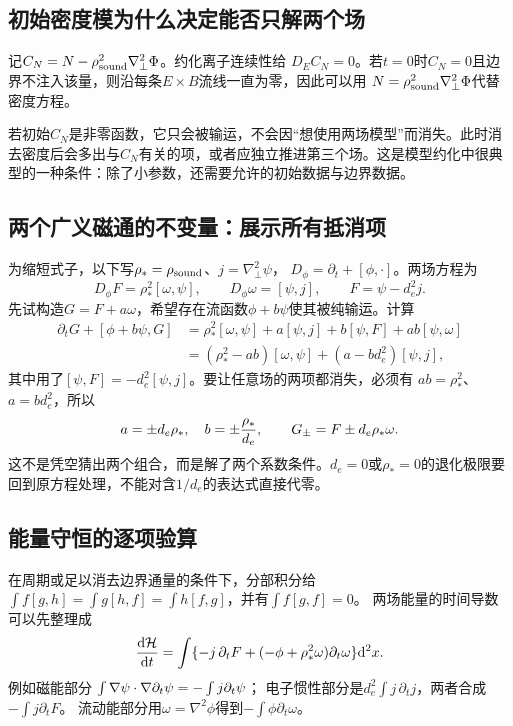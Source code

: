\subsection{初始密度模为什么决定能否只解两个场}
记$C_N=N-\rho_{\rm sound}^2\nabla_\perp^2\Phi$。约化离子连续性给
$D_EC_N=0$。若$t=0$时$C_N=0$且边界不注入该量，则沿每条$E\times B$流线一直为零，因此可以用
$N=\rho_{\rm sound}^2\nabla_\perp^2\Phi$代替密度方程。

若初始$C_N$是非零函数，它只会被输运，不会因“想使用两场模型”而消失。此时消去密度后会多出与$C_N$有关的项，或者应独立推进第三个场。这是模型约化中很典型的一种条件：除了小参数，还需要允许的初始数据与边界数据。

\subsection{两个广义磁通的不变量：展示所有抵消项}
为缩短式子，以下写$\rho_*=\rho_{\rm sound}$、$j=\nabla_\perp^2\psi$，
$D_\phi=\partial_t+[\phi,\cdot]$。两场方程为
\begin{equation}
 D_\phi F=\rho_*^2[\omega,\psi],\qquad
 D_\phi\omega=[\psi,j],\qquad F=\psi-d_e^2j.
\end{equation}
先试构造$G=F+a\omega$，希望存在流函数$\phi+b\psi$使其被纯输运。计算
\begin{align}
 \partial_tG+[\phi+b\psi,G]
 &=\rho_*^2[\omega,\psi]+a[\psi,j]+b[\psi,F]+ab[\psi,\omega]\\
 &=(\rho_*^2-ab)[\omega,\psi]+(a-bd_e^2)[\psi,j],
\end{align}
其中用了$[\psi,F]=-d_e^2[\psi,j]$。要让任意场的两项都消失，必须有
$ab=\rho_*^2$、$a=bd_e^2$，所以
\begin{equation}
 a=\pm d_e\rho_*,\quad b=\pm{\rho_*\over d_e},\qquad
 G_\pm=F\pm d_e\rho_*\omega.
\end{equation}
这不是凭空猜出两个组合，而是解了两个系数条件。$d_e=0$或$\rho_*=0$的退化极限要回到原方程处理，不能对含$1/d_e$的表达式直接代零。

\subsection{能量守恒的逐项验算}
在周期或足以消去边界通量的条件下，分部积分给
$\int f[g,h]=\int g[h,f]=\int h[f,g]$，并有$\int f[g,f]=0$。
两场能量的时间导数可以先整理成
\begin{equation}
 {\mathrm d\mathcal H\over\mathrm dt}
 =\int\{-j\,\partial_tF+(-\phi+\rho_*^2\omega)\partial_t\omega\}\mathrm d^2x.
\end{equation}
例如磁能部分
$\int\nabla\psi\cdot\nabla\partial_t\psi=-\int j\partial_t\psi$；
电子惯性部分是$d_e^2\int j\,\partial_tj$，两者合成$-\int j\partial_tF$。
流动能部分用$\omega=\nabla^2\phi$得到$-\int\phi\partial_t\omega$。

